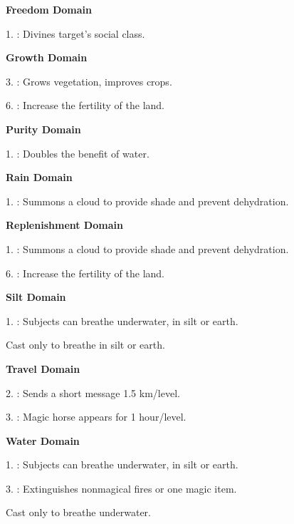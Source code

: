 \noindent\textbf{Freedom Domain}
\begin{itemize*}
	\item[1.] : Divines target's social class.
\end{itemize*}

\noindent\textbf{Growth Domain}
\begin{itemize*}
	\item[3.] : Grows vegetation, improves crops.
	\item[6.] : Increase the fertility of the land.
\end{itemize*}

\noindent\textbf{Purity Domain}
\begin{itemize*}
	\item[1.] : Doubles the benefit of water.
\end{itemize*}

\noindent\textbf{Rain Domain}
\begin{itemize*}
	\item[1.] : Summons a cloud to provide shade and prevent dehydration.
\end{itemize*}

\noindent\textbf{Replenishment Domain}
\begin{itemize*}
	\item[1.] : Summons a cloud to provide shade and prevent dehydration.
	\item[6.] : Increase the fertility of the land.
\end{itemize*}

\noindent\textbf{Silt Domain}
\begin{itemize*}
	\item[1.] \footnotemark[1]: Subjects can breathe underwater, in silt or earth.
\end{itemize*}
 Cast only to breathe in silt or earth.

\noindent\textbf{Travel Domain}
\begin{itemize*}
	\item[2.] : Sends a short message 1.5 km/level.
	\item[3.] : Magic horse appears for 1 hour/level.
\end{itemize*}

\noindent\textbf{Water Domain}
\begin{itemize*}
	\item[1.] \footnotemark[1]: Subjects can breathe underwater, in silt or earth.
	\item[3.] : Extinguishes nonmagical fires or one magic item.
\end{itemize*}
 Cast only to breathe underwater.

